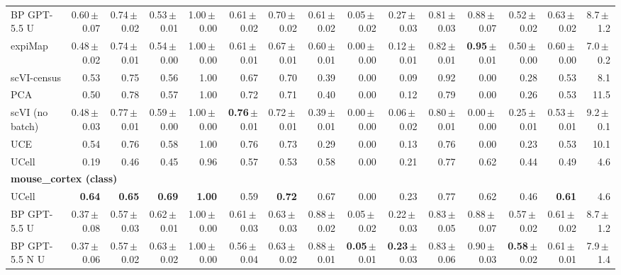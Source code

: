 \begin{table}
\begin{tabular}{lrrrrrrrrrrrrrr}
BP GPT-5.5 U & 0.60\,$\pm$\,0.07 & 0.74\,$\pm$\,0.02 & 0.53\,$\pm$\,0.01 & 1.00\,$\pm$\,0.00 & 0.61\,$\pm$\,0.02 & 0.70\,$\pm$\,0.02 & 0.61\,$\pm$\,0.02 & 0.05\,$\pm$\,0.02 & 0.27\,$\pm$\,0.03 & 0.81\,$\pm$\,0.03 & 0.88\,$\pm$\,0.07 & 0.52\,$\pm$\,0.02 & 0.63\,$\pm$\,0.02 & 8.7\,$\pm$\,1.2 \\
expiMap & 0.48\,$\pm$\,0.02 & 0.74\,$\pm$\,0.01 & 0.54\,$\pm$\,0.00 & 1.00\,$\pm$\,0.00 & 0.61\,$\pm$\,0.01 & 0.67\,$\pm$\,0.01 & 0.60\,$\pm$\,0.01 & 0.00\,$\pm$\,0.00 & 0.12\,$\pm$\,0.01 & 0.82\,$\pm$\,0.01 & \textbf{0.95}\,$\pm$\,0.01 & 0.50\,$\pm$\,0.00 & 0.60\,$\pm$\,0.00 & 7.0\,$\pm$\,0.2 \\
scVI-census & 0.53 & 0.75 & 0.56 & 1.00 & 0.67 & 0.70 & 0.39 & 0.00 & 0.09 & 0.92 & 0.00 & 0.28 & 0.53 & 8.1 \\
PCA & 0.50 & 0.78 & 0.57 & 1.00 & 0.72 & 0.71 & 0.40 & 0.00 & 0.12 & 0.79 & 0.00 & 0.26 & 0.53 & 11.5 \\
scVI (no batch) & 0.48\,$\pm$\,0.03 & 0.77\,$\pm$\,0.01 & 0.59\,$\pm$\,0.00 & 1.00\,$\pm$\,0.00 & \textbf{0.76}\,$\pm$\,0.01 & 0.72\,$\pm$\,0.01 & 0.39\,$\pm$\,0.01 & 0.00\,$\pm$\,0.00 & 0.06\,$\pm$\,0.02 & 0.80\,$\pm$\,0.01 & 0.00\,$\pm$\,0.00 & 0.25\,$\pm$\,0.01 & 0.53\,$\pm$\,0.01 & 9.2\,$\pm$\,0.1 \\
UCE & 0.54 & 0.76 & 0.58 & 1.00 & 0.76 & 0.73 & 0.29 & 0.00 & 0.13 & 0.76 & 0.00 & 0.23 & 0.53 & 10.1 \\
UCell & 0.19 & 0.46 & 0.45 & 0.96 & 0.57 & 0.53 & 0.58 & 0.00 & 0.21 & 0.77 & 0.62 & 0.44 & 0.49 & 4.6 \\
\midrule
\multicolumn{15}{l}{\textbf{mouse\_cortex (class)}}\\[1pt]
UCell & \textbf{0.64} & \textbf{0.65} & \textbf{0.69} & \textbf{1.00} & 0.59 & \textbf{0.72} & 0.67 & 0.00 & 0.23 & 0.77 & 0.62 & 0.46 & \textbf{0.61} & 4.6 \\
BP GPT-5.5 U & 0.37\,$\pm$\,0.08 & 0.57\,$\pm$\,0.03 & 0.62\,$\pm$\,0.01 & 1.00\,$\pm$\,0.00 & 0.61\,$\pm$\,0.03 & 0.63\,$\pm$\,0.03 & 0.88\,$\pm$\,0.02 & 0.05\,$\pm$\,0.02 & 0.22\,$\pm$\,0.03 & 0.83\,$\pm$\,0.05 & 0.88\,$\pm$\,0.07 & 0.57\,$\pm$\,0.02 & 0.61\,$\pm$\,0.02 & 8.7\,$\pm$\,1.2 \\
BP GPT-5.5 N U & 0.37\,$\pm$\,0.06 & 0.57\,$\pm$\,0.02 & 0.63\,$\pm$\,0.02 & 1.00\,$\pm$\,0.00 & 0.56\,$\pm$\,0.04 & 0.63\,$\pm$\,0.02 & 0.88\,$\pm$\,0.01 & \textbf{0.05}\,$\pm$\,0.01 & \textbf{0.23}\,$\pm$\,0.03 & 0.83\,$\pm$\,0.06 & 0.90\,$\pm$\,0.03 & \textbf{0.58}\,$\pm$\,0.02 & 0.61\,$\pm$\,0.01 & 7.9\,$\pm$\,1.4 \\

\end{tabular}
\end{table}
